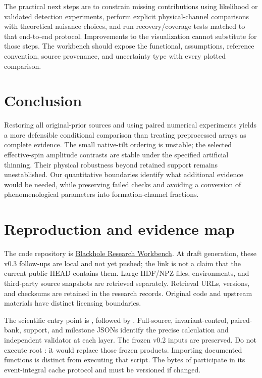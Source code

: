 The practical next steps are to constrain missing contributions using likelihood or validated detection experiments, perform explicit physical-channel comparisons with theoretical nuisance choices, and run recovery/coverage tests matched to that end-to-end protocol. Improvements to the visualization cannot substitute for those steps. The workbench should expose the functional, assumptions, reference convention, source provenance, and uncertainty type with every plotted comparison.

\section{Conclusion}
Restoring all original-prior sources and using paired numerical experiments yields a more defensible conditional comparison than treating preprocessed arrays as complete evidence. The small native-tilt ordering is unstable; the selected effective-spin amplitude contrasts are stable under the specified artificial thinning. Their physical robustness beyond retained support remains unestablished. Our quantitative boundaries identify what additional evidence would be needed, while preserving failed checks and avoiding a conversion of phenomenological parameters into formation-channel fractions.

\appendix
\section{Reproduction and evidence map}\label{app:repro}
The code repository is \href{https://github.com/wkryyds4-netizen/blackhole-research-workbench}{Blackhole Research Workbench}. At draft generation, these v0.3 follow-ups are local and not yet pushed; the link is not a claim that the current public HEAD contains them. Large HDF/NPZ files, environments, and third-party source snapshots are retrieved separately. Retrieval URLs, versions, and checksums are retained in the research records. Original code and upstream materials have distinct licensing boundaries.

The scientific entry point is , followed by . Full-source, invariant-control, paired-bank, support, and milestone JSONs identify the precise calculation and independent validator at each layer. The frozen v0.2 inputs are preserved. Do not execute root : it would replace those frozen products. Importing documented functions is distinct from executing that script. The bytes of  participate in its event-integral cache protocol and must be versioned if changed.

